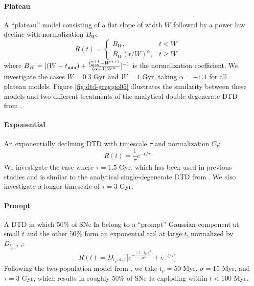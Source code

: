 \documentclass[twocolumn,linenumbers,twocolappendix]{aastex631}
\begin{document}
\paragraph{Plateau} A ``plateau'' model consisting of a flat slope of width $W$ followed by a power law decline with normalization $B_W$:
\begin{equation}
    R(t) = 
    \begin{cases}
        B_W, & t < W \\
        B_W (t/W)^\alpha, & t \ge W
    \end{cases}
    \label{eq:plateau-dtd}
\end{equation}
where $B_W=[(W-t_{\rm min}) + \frac{t_{\rm max}^{\alpha+1} - W^{\alpha+1}}{(\alpha+1)W^\alpha}]^{-1}$ is the normalization coefficient.
We investigate the cases $W=0.3$ Gyr and $W=1$ Gyr, taking $\alpha=-1.1$ for all plateau models. Figure \ref{fig:dtd-greggio05} illustrates the similarity between these models and two different treatments of the analytical double-degenerate DTD from \citet{Greggio2005-AnalyticalRates}.

\paragraph{Exponential} An exponentially declining DTD with timescale $\tau$ and normalization $C_\tau$:
\begin{equation}
    R(t) = \frac{1}{\tau} e^{-t/\tau}
    \label{eq:exponential-dtd}
\end{equation}
We investigate the case where $\tau=1.5$ Gyr, which has been used in previous studies \citep[e.g.,][]{Schonrich2009-RadialMixing,Weinberg2017-ChemicalEquilibrium} and is similar to the analytical single-degenerate DTD from \citet{Greggio2005-AnalyticalRates}. We also investigate a longer timescale of $\tau=3$ Gyr.

\paragraph{Prompt} A DTD in which 50\% of SNe Ia belong to a ``prompt'' Gaussian component at small $t$ and the other 50\% form an exponential tail at large $t$, normalized by $D_{t_p,\sigma,\tau}$:
\begin{equation}
    R(t) = D_{t_p,\sigma,\tau} \Big[e^{-\frac{(t-t_p)^2}{2\sigma^2}} + e^{-t/\tau}\Big]
    \label{eq:prompt-dtd}
\end{equation}
Following the two-population model from \citet{Mannucci2006-TwoPopulations}, we take $t_p=50$ Myr, $\sigma=15$ Myr, and $\tau=3$ Gyr, which results in roughly 50\% of SNe Ia exploding within $t<100$ Myr.
\end{document}
